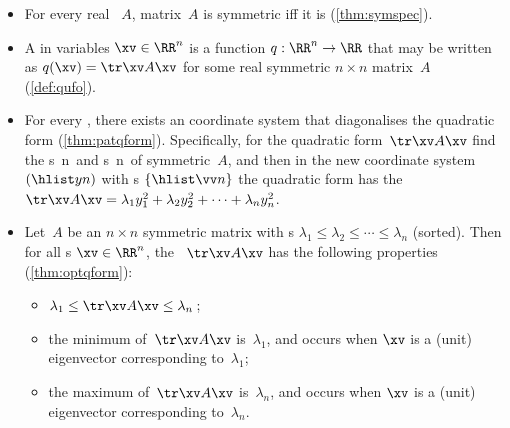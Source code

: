 \begin{itemize}
\item For every real ~\(A\), 
matrix~\(A\) is symmetric iff it is  (\autoref{thm:symspec}).

\item A  in variables \(\xv\in\RR^n\) is a function \(q:\RR^n\to\RR\) that may be written as \(q(\xv)=\tr\xv A\xv\) for some real symmetric \(n\times n\) matrix~\(A\) (\autoref{def:qufo}).

\item For every , there exists an  coordinate system that diagonalises the quadratic form (\autoref{thm:patqform}).
Specifically, for the quadratic form~\(\tr\xv A\xv\) find the s~\hlist\lambda n\ and  s~\hlist\vv n\ of symmetric~\(A\), and then in the new coordinate system~\((\hlist yn)\) with s \(\{\hlist\vv n\}\) the quadratic form has the  \(\tr\xv A\xv=\lambda_1y_1^2+\lambda_2y_2^2+\cdots+\lambda_ny_n^2\).

\item Let~\(A\) be an \(n\times n\) symmetric matrix with s \(\lambda_1\leq\lambda_2\leq\cdots\leq\lambda_n\) (sorted). 
Then for all s \(\xv\in\RR^n\), the ~\(\tr\xv A\xv\) has the following properties (\autoref{thm:optqform}):
\begin{itemize}
\item \(\lambda_1\leq \tr\xv A\xv\leq\lambda_n\)\,;
\item the minimum of~\(\tr\xv A\xv\) is~\(\lambda_1\), and occurs when \(\xv\) is a (unit) eigenvector corresponding to~\(\lambda_1\);
\item the maximum of~\(\tr\xv A\xv\) is~\(\lambda_n\), and occurs when \(\xv\) is a (unit) eigenvector corresponding to~\(\lambda_n\).
\end{itemize}





\end{itemize}





\makeanswers
